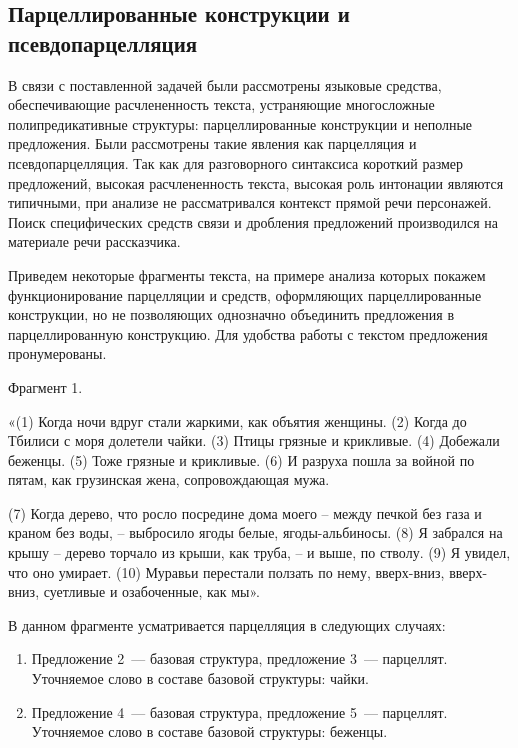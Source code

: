 \documentclass{kursa4}
\begin{document}
{      \subsection{Парцеллированные конструкции и псевдопарцелляция}

      В связи с поставленной задачей были рассмотрены языковые средства,
      обеспечивающие расчлененность текста, устраняющие многосложные
      полипредикативные структуры: парцеллированные конструкции и неполные
      предложения. Были рассмотрены такие явления как парцелляция и
      псевдопарцелляция. Так как для разговорного синтаксиса короткий размер
      предложений, высокая расчлененность текста, высокая роль интонации
      являются типичными, при анализе не рассматривался контекст прямой
      речи персонажей. Поиск специфических средств связи и дробления
      предложений производился на материале речи рассказчика. 

      Приведем некоторые фрагменты текста, на примере анализа которых
      покажем функционирование парцелляции и средств, оформляющих
      парцеллированные конструкции, но не позволяющих однозначно объединить
      предложения в парцеллированную конструкцию. Для удобства работы с текстом предложения пронумерованы.

      Фрагмент 1. 

      «(1) Когда ночи вдруг стали жаркими, как объятия женщины. (2) Когда до Тбилиси с моря долетели чайки. (3) Птицы грязные и крикливые. (4) Добежали беженцы. (5) Тоже грязные и крикливые. (6) И разруха пошла за войной по пятам, как грузинская жена, сопровождающая мужа.

      (7) Когда дерево, что росло посредине дома моего – между печкой без газа и краном без воды, – выбросило ягоды белые, ягоды-альбиносы. (8) Я забрался на крышу – дерево торчало из крыши, как труба, – и выше, по стволу. (9) Я увидел, что оно
      умирает. (10) Муравьи перестали ползать по нему, вверх-вниз,
      вверх-вниз, суетливые и озабоченные, как мы». 

      В данном фрагменте усматривается
      парцелляция в следующих случаях:

      \begin{enumerate}
        \item Предложение 2~--- базовая структура, предложение 3~--- парцеллят. \newline
        Уточняемое слово в составе базовой структуры: чайки. 

        \item Предложение 4~--- базовая структура, предложение 5~--- парцеллят. \newline
        Уточняемое слово в составе базовой структуры: беженцы. 
      \end{enumerate}

}
\end{document}
